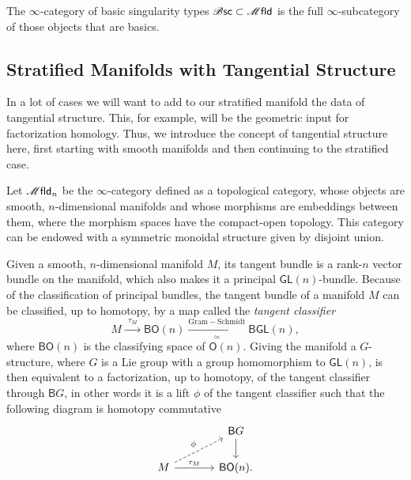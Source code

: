 \documentclass[../text]{subfiles}
\begin{document}
\begin{definition}
    The $\infty$-category of basic singularity types $\bsc \subset \mfld$ is the full $\infty$-subcategory of those objects that are basics.
\end{definition}





\subsection{Stratified Manifolds with Tangential Structure}

In a lot of cases we will want to add to our stratified manifold the data of tangential structure. This, for example, will be the geometric input for factorization homology. Thus, we introduce the concept of tangential structure here, first starting with smooth manifolds and then continuing to the stratified case.

\begin{definition}
    Let $\mfld_n$ be the $\infty$-category defined as a topological category, whose objects are smooth, $n$-dimensional manifolds and whose morphisms are embeddings between them, where the morphism spaces have the compact-open topology. This category can be endowed with a symmetric monoidal structure given by disjoint union.
\end{definition}

Given a smooth, $n$-dimensional manifold $M$, its tangent bundle is a rank-$n$ vector bundle on the manifold, which also makes it a principal $\mathsf{GL}(n)$-bundle. Because of the classification of principal bundles, the tangent bundle of a manifold $M$ can be classified, up to homotopy, by a map called the \emph{tangent classifier}
%
\begin{equation}
    M \xrightarrow{\ \ \tau_M \ \ } \mathsf{BO}(n) \xrightarrow[\simeq]{\mathrm{Gram-Schmidt}} \mathsf{BGL}(n),
\end{equation}
%
where $\mathsf{BO}(n)$ is the classifying space of $\mathsf{O}(n)$. Giving the manifold a $G$-structure, where $G$ is a Lie group with a group homomorphism to $\mathsf{GL}(n)$, is then equivalent to a factorization, up to homotopy, of the tangent classifier through $\mathsf{B}G$, in other words it is a lift $\phi$ of the tangent classifier such that the following diagram is homotopy commutative
%
\begin{equation}
    \begin{tikzcd}[column sep = large]
        & \mathsf{B}G \arrow[d] \\
        M \arrow[ru, dashed, "\phi"] \arrow[r, "\tau_M"] & \mathsf{BO}(n).
    \end{tikzcd}
\end{equation}
\end{document}
